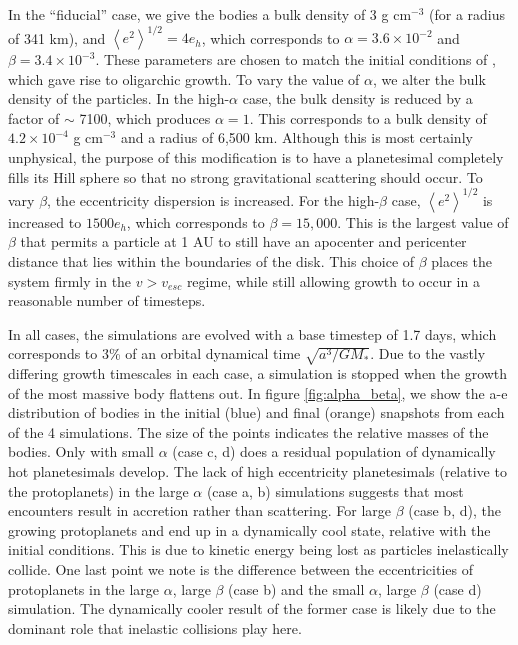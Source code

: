 \documentclass[twocolumn,linenumbers]{aastex63}
\begin{document}
In the ``fiducial'' case, we give the bodies a bulk density of 3 g
cm$^{-3}$ (for a radius of 341 km), and $\left< e^{2} \right>^{1/2} = 4 e_{h}$, which corresponds to $\alpha = 3.6 \times 10^{-2}$ and $\beta = 3.4 \times 10^{-3}$. These parameters are chosen to match the initial conditions of \citet{kokubo98}, which gave rise to oligarchic growth. 
To vary the value of $\alpha$, we alter the bulk density of the particles. In the high-$\alpha$ case, the bulk density is reduced by 
a factor of $\sim$ 7100, which produces $\alpha = 1$. This corresponds to a bulk density of $4.2 \times 10^{-4}$ g cm$^{-3}$ and a radius of 6,500 km. 
Although this is most certainly unphysical, the purpose of this modification is to have a planetesimal completely fills its Hill sphere so that no strong 
gravitational scattering should occur. To vary $\beta$, the eccentricity dispersion is increased. For the high-$
\beta$ case, $\left< e^{2} \right>^{1/2}$ is increased to $1500 e_{h}$, which corresponds to $\beta = 15,000$. This is the largest value of $\beta$ that permits a particle at 1 AU to still have an apocenter and pericenter distance that lies within the boundaries of the disk. This choice of $\beta$ places the system firmly in the $v > v_{esc}$ regime, while still allowing growth to occur in a reasonable number of timesteps.

In all cases, the simulations are evolved with a base timestep of 1.7
days, which corresponds to 3\% of an orbital dynamical time
$\sqrt{a^3/G M_{*}}$. Due to the vastly differing growth timescales in
each case, a simulation is stopped when the growth of the most massive
body flattens out. In figure \ref{fig:alpha_beta}, we show the a-e
distribution of bodies in the initial (blue) and final (orange)
snapshots from each of the 4 simulations. The size of the points
indicates the relative masses of the bodies. Only with small
$\alpha$ (case c, d) does a residual population of dynamically hot planetesimals
develop. The lack of high eccentricity planetesimals (relative to the protoplanets) in the large
$\alpha$ (case a, b) simulations suggests that most encounters result in accretion
rather than scattering. For large $\beta$ (case b, d), the growing protoplanets
and end up in a dynamically cool state,
relative with the initial conditions. This is due to kinetic energy 
being lost as particles inelastically collide. One last point we note
is the difference between the eccentricities of protoplanets in the 
large $\alpha$, large $\beta$ (case b) and the small $\alpha$,
large $\beta$ (case d) simulation. The dynamically cooler result of the former case
is likely due to the dominant role that inelastic collisions play here.
\end{document}
